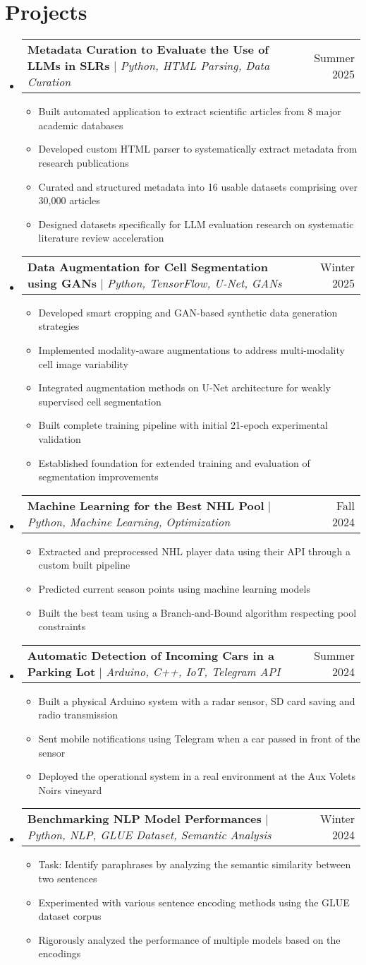 \documentclass[letterpaper,11pt]{article}
\makeatletter
\newcommand{\resumeItem}[1]{
  \item\small{
    {#1 \vspace{-2pt}}
  }
}
\newcommand{\resumeProjectHeading}[2]{
    \item
    \begin{tabular*}{0.97\textwidth}{l@{\extracolsep{\fill}}r}
      \small#1 & #2 \\
    \end{tabular*}\vspace{-7pt}
}
\newcommand{\resumeSubHeadingListStart}{\begin{itemize}[leftmargin=0.15in, label={}]}
\newcommand{\resumeSubHeadingListEnd}{\end{itemize}}
\newcommand{\resumeItemListStart}{\begin{itemize}}
\newcommand{\resumeItemListEnd}{\end{itemize}\vspace{-5pt}}
\makeatother
\begin{document}
\section{Projects}
    \resumeSubHeadingListStart
      \resumeProjectHeading
          {\textbf{Metadata Curation to Evaluate the Use of LLMs in SLRs} $|$ \emph{Python, HTML Parsing, Data Curation}}{Summer 2025}
          \resumeItemListStart
            \resumeItem{Built automated application to extract scientific articles from 8 major academic databases}
            \resumeItem{Developed custom HTML parser to systematically extract metadata from research publications}
            \resumeItem{Curated and structured metadata into 16 usable datasets comprising over 30,000 articles}
            \resumeItem{Designed datasets specifically for LLM evaluation research on systematic literature review acceleration}
          \resumeItemListEnd
      \resumeProjectHeading
          {\textbf{Data Augmentation for Cell Segmentation using GANs} $|$ \emph{Python, TensorFlow, U-Net, GANs}}{Winter 2025}
          \resumeItemListStart
            \resumeItem{Developed smart cropping and GAN-based synthetic data generation strategies}
            \resumeItem{Implemented modality-aware augmentations to address multi-modality cell image variability}
            \resumeItem{Integrated augmentation methods on U-Net architecture for weakly supervised cell segmentation}
            \resumeItem{Built complete training pipeline with initial 21-epoch experimental validation}
            \resumeItem{Established foundation for extended training and evaluation of segmentation improvements}
          \resumeItemListEnd
      \resumeProjectHeading
          {\textbf{Machine Learning for the Best NHL Pool} $|$ \emph{Python, Machine Learning, Optimization}}{Fall 2024}
          \resumeItemListStart
            \resumeItem{Extracted and preprocessed NHL player data using their API through a custom built pipeline}
            \resumeItem{Predicted current season points using machine learning models}
            \resumeItem{Built the best team using a Branch-and-Bound algorithm respecting pool constraints}
          \resumeItemListEnd
      \resumeProjectHeading
          {\textbf{Automatic Detection of Incoming Cars in a Parking Lot} $|$ \emph{Arduino, C++, IoT, Telegram API}}{Summer 2024}
          \resumeItemListStart
            \resumeItem{Built a physical Arduino system with a radar sensor, SD card saving and radio transmission}
            \resumeItem{Sent mobile notifications using Telegram when a car passed in front of the sensor}
            \resumeItem{Deployed the operational system in a real environment at the Aux Volets Noirs vineyard}
          \resumeItemListEnd
      \resumeProjectHeading
          {\textbf{Benchmarking NLP Model Performances} $|$ \emph{Python, NLP, GLUE Dataset, Semantic Analysis}}{Winter 2024}
          \resumeItemListStart
            \resumeItem{Task: Identify paraphrases by analyzing the semantic similarity between two sentences}
            \resumeItem{Experimented with various sentence encoding methods using the GLUE dataset corpus}
            \resumeItem{Rigorously analyzed the performance of multiple models based on the encodings}
          \resumeItemListEnd
    \resumeSubHeadingListEnd
\end{document}
